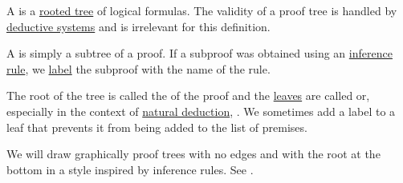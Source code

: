 \begin{definition}\label{def:proof_tree}\mimprovised
  A  is a \hyperref[def:rooted_tree]{rooted tree} of logical formulas. The validity of a proof tree is handled by \hyperref[def:deductive_system]{deductive systems} and is irrelevant for this definition.

  \begin{thmenum}
     A  is simply a subtree of a proof. If a subproof was obtained using an \hyperref[con:judgment/inference_rule]{inference rule}, we \hyperref[def:labeled_set]{label} the subproof with the name of the rule.

     The root of the tree is called the  of the proof and the \hyperref[def:rooted_tree/leaf]{leaves} are called  or, especially in the context of \hyperref[def:natural_deduction_system]{natural deduction}, . We sometimes add a  label to a leaf that prevents it from being added to the list of premises.

     We will draw graphically proof trees with no edges and with the root at the bottom in a style inspired by inference rules. See .
  \end{thmenum}
\end{definition}

